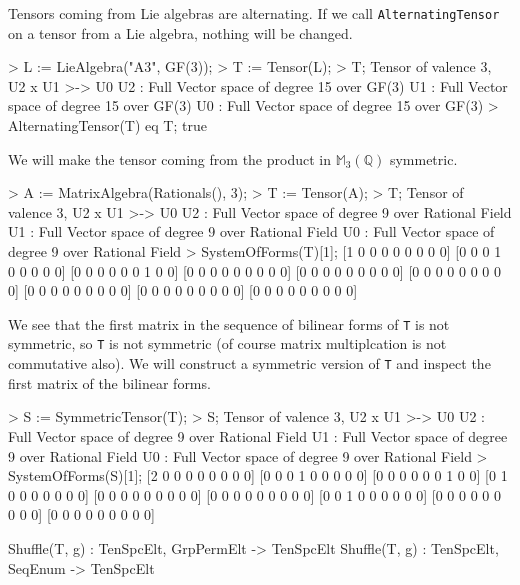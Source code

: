 \begin{example}[AlternatingTensor]

Tensors coming from Lie algebras are alternating.
If we call {\tt AlternatingTensor} on a tensor from a Lie algebra, nothing will be changed.
\begin{code}
> L := LieAlgebra("A3", GF(3));
> T := Tensor(L);
> T;
Tensor of valence 3, U2 x U1 >-> U0
U2 : Full Vector space of degree 15 over GF(3)
U1 : Full Vector space of degree 15 over GF(3)
U0 : Full Vector space of degree 15 over GF(3)
> AlternatingTensor(T) eq T;
true
\end{code}
\end{example}

\begin{example}[MakeSymmetric]

We will make the tensor coming from the product in $\mathbb{M}_3(\mathbb{Q})$ symmetric.
\begin{code}
> A := MatrixAlgebra(Rationals(), 3);
> T := Tensor(A);
> T;
Tensor of valence 3, U2 x U1 >-> U0
U2 : Full Vector space of degree 9 over Rational Field
U1 : Full Vector space of degree 9 over Rational Field
U0 : Full Vector space of degree 9 over Rational Field
> SystemOfForms(T)[1];
[1 0 0 0 0 0 0 0 0]
[0 0 0 1 0 0 0 0 0]
[0 0 0 0 0 0 1 0 0]
[0 0 0 0 0 0 0 0 0]
[0 0 0 0 0 0 0 0 0]
[0 0 0 0 0 0 0 0 0]
[0 0 0 0 0 0 0 0 0]
[0 0 0 0 0 0 0 0 0]
[0 0 0 0 0 0 0 0 0]
\end{code}

We see that the first matrix in the sequence of bilinear forms of {\tt T} is not symmetric, so {\tt T} is not symmetric (of course matrix multiplcation is not commutative also). 
We will construct a symmetric version of {\tt T} and inspect the first matrix of the bilinear forms.
\begin{code}
> S := SymmetricTensor(T);
> S;
Tensor of valence 3, U2 x U1 >-> U0
U2 : Full Vector space of degree 9 over Rational Field
U1 : Full Vector space of degree 9 over Rational Field
U0 : Full Vector space of degree 9 over Rational Field
> SystemOfForms(S)[1];
[2 0 0 0 0 0 0 0 0]
[0 0 0 1 0 0 0 0 0]
[0 0 0 0 0 0 1 0 0]
[0 1 0 0 0 0 0 0 0]
[0 0 0 0 0 0 0 0 0]
[0 0 0 0 0 0 0 0 0]
[0 0 1 0 0 0 0 0 0]
[0 0 0 0 0 0 0 0 0]
[0 0 0 0 0 0 0 0 0]
\end{code}
\end{example}


\begin{intrinsics}
Shuffle(T, g) : TenSpcElt, GrpPermElt -> TenSpcElt
Shuffle(T, g) : TenSpcElt, SeqEnum -> TenSpcElt
\end{intrinsics}

